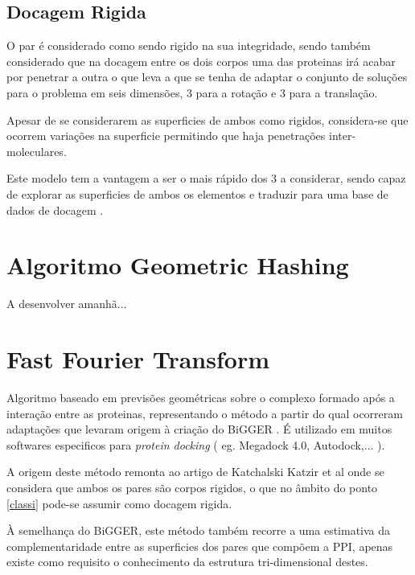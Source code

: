\subsection{Docagem Rigida} 
O par é considerado como sendo rigido na sua integridade, sendo também considerado que na docagem entre os dois corpos uma das proteinas irá acabar por penetrar a outra o que leva a que se tenha de adaptar o conjunto de soluções para o problema em seis dimensões, 3 para a rotação e 3 para a translação.

Apesar de se considerarem as superficies de ambos como rigidos, considera-se que ocorrem variações na superficie permitindo que haja penetrações inter-moleculares.

Este modelo tem a vantagem a ser o mais rápido dos 3 a considerar, sendo capaz de explorar as superficies de ambos os elementos e traduzir para uma base de dados de docagem \cite{halperin}.




\section{Algoritmo Geometric Hashing}
A desenvolver amanhã...


\section{Fast Fourier Transform}
Algoritmo baseado em previsões geométricas sobre o complexo formado após a interação entre as proteinas, representando o método a partir do qual ocorreram adaptações que levaram origem à criação do BiGGER \cite{biggerPaper}.
É utilizado em muitos softwares especificos para \textit{protein docking} ( eg. Megadock 4.0, Autodock,... ). 

A origem deste método remonta ao artigo de Katchalski Katzir et al \cite{katchalski1992} onde se considera que ambos os pares são corpos rigidos, o que no âmbito do ponto \ref{classi} pode-se assumir como docagem rigida.

 À semelhança do BiGGER, este método também recorre a uma estimativa da complementaridade entre as superficies dos pares que compõem a PPI, apenas existe como requisito o conhecimento da estrutura tri-dimensional destes.
 
